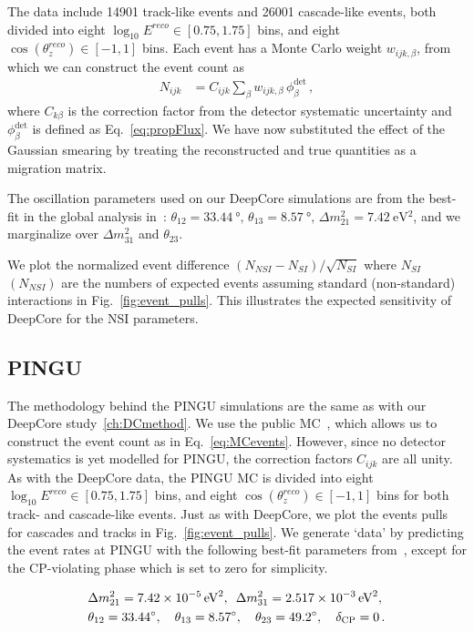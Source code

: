 \documentclass[draft=True]{revtex4-2}
\newcommand{\zreco}{\ensuremath{\cos{(\theta_z^{reco})}}}
\newcommand{\dm}{\Delta m^2_{31}}
\begin{document}
The data include 14901 track-like events and 26001 cascade-like events, both divided into eight 
$ \log_{10}E^{reco} \in [0.75,1.75]$ bins, and eight $\zreco \in [-1,1]$ bins. Each event has a Monte Carlo weight $w_{ijk,\beta}$,
from which we can construct the event count as
\begin{align}\label{eq:MCevents}
    N_{ijk} &= C_{ijk}\sum_{\beta}w_{ijk,\beta}\, \phi_\beta^\text{det}\,,
\end{align}
where $C_{k\beta}$ is the correction factor from the detector systematic uncertainty and $\phi_\beta^\text{det}$ is defined as Eq.~\ref{eq:propFlux}. We have now substituted the effect of the Gaussian smearing 
by treating the reconstructed and true quantities as a migration matrix. 

The oscillation parameters used on our DeepCore simulations are from the
best-fit in the global analysis in~\cite{nufit}: $\theta_{12} = \SI{33.44}{\degree},\, \theta_{13} = \SI{8.57}{\degree},\, \Delta m^2_{21} =  \SI{7.42}{\electronvolt^2}$, and we 
marginalize over $\dm$ and $\theta_{23}$.

We plot the normalized event difference $(N_{NSI} - N_{SI})/\sqrt{N_{SI}}$ where $N_{SI}$ $(N_{NSI})$ are the numbers of expected events
assuming standard (non-standard) interactions in Fig.~\ref{fig:event_pulls}. This illustrates the expected sensitivity of DeepCore for the NSI parameters.


\subsection{PINGU}\label{ch:PINGUmethod}
The methodology behind the PINGU simulations are the same as with our DeepCore study~\ref{ch:DCmethod}. We use the public MC~\cite{PINGUdata}, which allows us to construct the event count as in Eq.~\ref{eq:MCevents}.
However, since no detector systematics is yet modelled for PINGU, the correction factors $C_{ijk}$ are all unity.
As with the DeepCore data, the PINGU MC is divided into eight 
$\log_{10}E^{reco} \in [0.75,1.75]$ bins, and eight $\zreco \in [-1,1]$ bins for both track- and cascade-like events. Just as with DeepCore, 
we plot the events pulls for cascades and tracks in Fig.~\ref{fig:event_pulls}. %
We generate `data' by predicting the event rates at PINGU with the following best-fit parameters from~\cite{nufit}, except for the CP-violating phase which is set to zero for simplicity.

\begin{align}\label{eq:PINGUparams}
    &\Delta m^2_{21} =  \SI{7.42e-5}{\electronvolt^2},\hspace{0.5em} \dm =  \SI{2.517e-3}{\electronvolt^2}, \nonumber \\
    &\theta_{12} = \SI{33.44}{\degree},\hspace{1em} \theta_{13} = \SI{8.57}{\degree},\hspace{1em} \theta_{23} = \SI{49.2}{\degree}, \hspace{1em} \delta_\text{CP} = 0\,.
\end{align}
\end{document}

